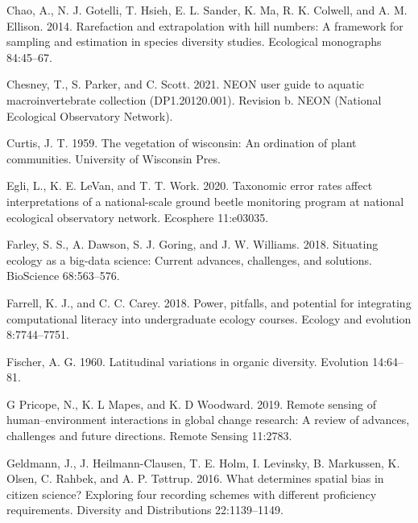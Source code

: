 \documentclass[
  12pt,
]{article}
\newlength{\cslhangindent}
\newlength{\cslentryspacingunit} %
\newenvironment{CSLReferences}[2] %
 {%
  \setlength{\parindent}{0pt}
  \ifodd #1
  \let\oldpar\par
  \def\par{\hangindent=\cslhangindent\oldpar}
  \fi
  \setlength{\parskip}{#2\cslentryspacingunit}
 }%
 {}
\begin{document}
\begin{CSLReferences}{1}{0}
\leavevmode{}%
Chao, A., N. J. Gotelli, T. Hsieh, E. L. Sander, K. Ma, R. K. Colwell, and A. M. Ellison. 2014. Rarefaction and extrapolation with hill numbers: A framework for sampling and estimation in species diversity studies. Ecological monographs 84:45--67.

\leavevmode{}%
Chesney, T., S. Parker, and C. Scott. 2021. NEON user guide to aquatic macroinvertebrate collection (DP1.20120.001). Revision b. NEON (National Ecological Observatory Network).

\leavevmode{}%
Curtis, J. T. 1959. The vegetation of wisconsin: An ordination of plant communities. University of Wisconsin Pres.

\leavevmode{}%
Egli, L., K. E. LeVan, and T. T. Work. 2020. Taxonomic error rates affect interpretations of a national-scale ground beetle monitoring program at national ecological observatory network. Ecosphere 11:e03035.

\leavevmode{}%
Farley, S. S., A. Dawson, S. J. Goring, and J. W. Williams. 2018. Situating ecology as a big-data science: Current advances, challenges, and solutions. BioScience 68:563--576.

\leavevmode{}%
Farrell, K. J., and C. C. Carey. 2018. Power, pitfalls, and potential for integrating computational literacy into undergraduate ecology courses. Ecology and evolution 8:7744--7751.

\leavevmode{}%
Fischer, A. G. 1960. Latitudinal variations in organic diversity. Evolution 14:64--81.

\leavevmode{}%
G Pricope, N., K. L Mapes, and K. D Woodward. 2019. Remote sensing of human--environment interactions in global change research: A review of advances, challenges and future directions. Remote Sensing 11:2783.

\leavevmode{}%
Geldmann, J., J. Heilmann-Clausen, T. E. Holm, I. Levinsky, B. Markussen, K. Olsen, C. Rahbek, and A. P. Tøttrup. 2016. What determines spatial bias in citizen science? Exploring four recording schemes with different proficiency requirements. Diversity and Distributions 22:1139--1149.


\end{CSLReferences}
\end{document}
